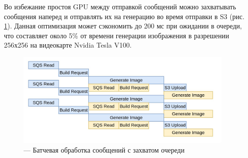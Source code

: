 Во избежание простоя GPU между отправкой сообщений можно захватывать сообщения наперед
и отправлять их на генерацию во время отправки в S3 (рис. \ref{fig:flame2}).
Данная оптимизация может сэкономить до 200 мс при ожидании в очереди, что составляет
около 5\% от времени генерации изображения в разрешении 256х256 на видеокарте Nvidia Tesla V100.

\begin{footnotesize}
\begin{figure}[H]
  \centering
  \includegraphics[width=0.95\textwidth]{img/flame2.jpg}
  \caption{--- Батчевая обработка сообщений с захватом очереди}
    \label{fig:flame2}
\end{figure}
\end{footnotesize}